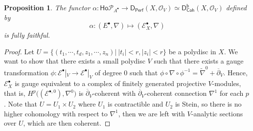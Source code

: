 \documentclass[12pt]{amsart}
\newtheorem{prop}[thm]{Proposition}
\theoremstyle{definition}
\theoremstyle{remark}
\numberwithin{equation}{section}
\newcommand{\del}{\partial}
\renewcommand{\del}{\partial}
\newcommand{\CO}{{\mathcal O}}
\newcommand{\1}{{\mathbb{1}}}
\newcommand{\ho}{\mathsf{Ho}}
\newcommand{\dcoh}{\mathsf{D^b_{Coh}}}
\newcommand{\dperf}{\mathsf{D_{Perf}}}
\begin{document}
\begin{prop}
The functor $\alpha: \ho \mathcal{P}_{A^{\bullet}} \to \dperf(X, \CO_V) \simeq \dcoh(X, \CO_V)$ defined by
\begin{equation}
    \alpha:(E^{\bullet}, \nabla) \mapsto (\mathcal{E}_X^{\bullet}, \nabla)
\end{equation}
is fully faithful.
\end{prop}
\begin{proof}
    Let $U = \{(t_1,\cdots, t_d, z_1,\cdots, z_n)| \ |t_i| < r, |z_i| < r\}$ be a polydisc in $X$. We want to show that there exists a small polydisc $V$ such that there exists a gauge transformation $\phi:\mathcal{E}^{\bullet}|_V \to \mathcal{E}^{\bullet}|_V$ of degree 0 such that 
    $\phi \circ \nabla \circ \phi^{-1} = \tilde{\nabla}^0 + \overline{\del}_V$. Hence, $\mathcal{E}^{\bullet}_X$ is gauge equivalent to a complex of finitely generated projective $V$-modules, that is, $H^p\big((\mathcal{E}^{\bullet, 0}), \nabla^0 \big)$ is $\overline{\del}_V$-coherent with $\overline{\del}_V$-coherent connection $\nabla^1$ for each $p$. Note that $U = U_1\times U_2$ where $U_1$ is contractible and $U_2$ is Stein, so there is no higher cohomology with respect to $\nabla^1$, then we are left with $V$-analytic sections over $U$, which are then coherent.
    

\end{proof}
\end{document}
